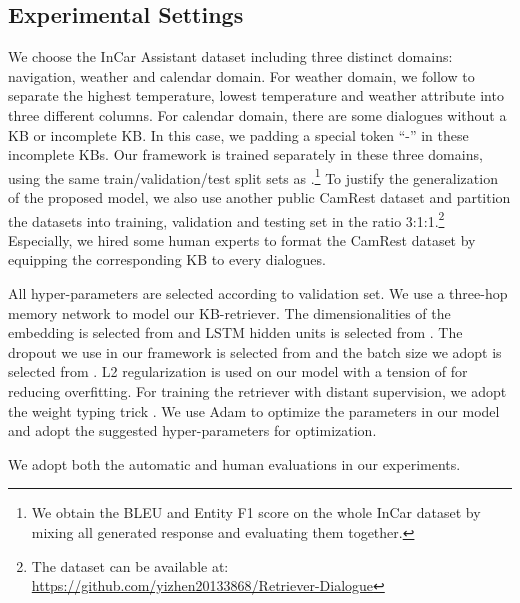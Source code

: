 \documentclass[11pt,a4paper]{article}
\begin{document}
 \subsection{Experimental Settings}
We choose the InCar Assistant dataset \cite{eric:2017:SIGDial} including three distinct domains: navigation, weather and calendar domain. 
For weather domain, we follow  to separate the highest temperature, lowest temperature and weather attribute into three different columns.
For calendar domain, there are some dialogues without a KB or incomplete KB.
In this case, we padding a special token ``-'' in these incomplete KBs.
Our framework is trained separately in these three domains, using the same train/validation/test split sets as .\footnote{We obtain the BLEU and Entity F1 score on the whole InCar dataset by mixing all generated response and evaluating them together.} 
To justify the generalization of the proposed model, we also use another public CamRest dataset \cite{wen:2017:EACL} and partition the datasets into training, validation and testing set in the ratio 3:1:1.\footnote{The dataset can be available at: \url{https://github.com/yizhen20133868/Retriever-Dialogue}}
Especially, we hired some human experts to format the CamRest dataset by equipping the corresponding KB to every dialogues. 
 
 All hyper-parameters are selected according
 to validation set. We use a three-hop memory network to model
 our KB-retriever.
 The dimensionalities of the embedding is selected from  and LSTM hidden units is selected from .
 The dropout we use in our framework is selected from  and the batch size we adopt is selected from  .
 L2 regularization is used on our model with a tension of  for reducing overfitting.
 For training the retriever with distant supervision, we adopt the weight typing trick \cite{E17-1001}.
 We use Adam \cite{kingma-ba:2014:ICLR} to optimize the parameters in our model and 
 adopt the suggested hyper-parameters for optimization.
 
 We adopt both the automatic and human evaluations in our experiments.
 
 
\end{document}
